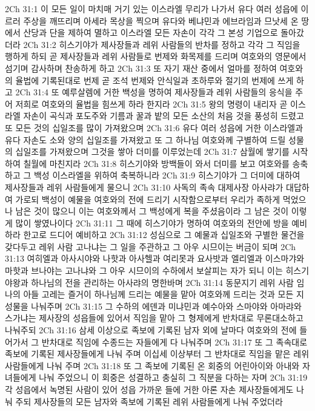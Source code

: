 2Ch 31:1  이 모든 일이 마치매 거기 있는 이스라엘 무리가 나가서 유다 여러 성읍에 이르러 주상을 깨뜨리며 아세라 목상을 찍으며 유다와 베냐민과 에브라임과 므낫세 온 땅에서 산당과 단을 제하여 멸하고 이스라엘 모든 자손이 각각 그 본성 기업으로 돌아갔더라
2Ch 31:2  히스기야가 제사장들과 레위 사람들의 반차를 정하고 각각 그 직임을 행하게 하되 곧 제사장들과 레위 사람들로 번제와 화목제를 드리며 여호와의 영문에서 섬기며 감사하며 찬송하게 하고
2Ch 31:3  또 자기 재산 중에서 얼마를 정하여 여호와의 율법에 기록된대로 번제 곧 조석 번제와 안식일과 초하루와 절기의 번제에 쓰게 하고
2Ch 31:4  또 예루살렘에 거한 백성을 명하여 제사장들과 레위 사람들의 응식을 주어 저희로 여호와의 율법을 힘쓰게 하라 한지라
2Ch 31:5  왕의 명령이 내리자 곧 이스라엘 자손이 곡식과 포도주와 기름과 꿀과 밭의 모든 소산의 처음 것을 풍성히 드렸고 또 모든 것의 십일조를 많이 가져왔으며
2Ch 31:6  유다 여러 성읍에 거한 이스라엘과 유다 자손도 소와 양의 십일조를 가져왔고 또 그 하나님 여호와께 구별하여 드릴 성물의 십일조를 가져왔으며 그것을 쌓아 더미를 이루었는데
2Ch 31:7  삼월에 쌓기를 시작하여 칠월에 마친지라
2Ch 31:8  히스기야와 방백들이 와서 더미를 보고 여호와를 송축하고 그 백성 이스라엘을 위하여 축복하니라
2Ch 31:9  히스기야가 그 더미에 대하여 제사장들과 레위 사람들에게 물으니
2Ch 31:10  사독의 족속 대제사장 아사랴가 대답하여 가로되 백성이 예물을 여호와의 전에 드리기 시작함으로부터 우리가 족하게 먹었으나 남은 것이 많으니 이는 여호와께서 그 백성에게 복을 주셨음이라 그 남은 것이 이렇게 많이 쌓였나이다
2Ch 31:11  그 때에 히스기야가 명하여 여호와의 전안에 방을 예비하라 한고로 드디어 예비하고
2Ch 31:12  성심으로 그 예물과 십일조와 구별한 물건을 갖다두고 레위 사람 고나냐는 그 일을 주관하고 그 아우 시므이는 버금이 되며
2Ch 31:13  여히엘과 아사시야와 나핫과 아사헬과 여리못과 요사밧과 엘리엘과 이스마갸와 마핫과 브나야는 고나냐와 그 아우 시므이의 수하에서 보살피는 자가 되니 이는 히스기야왕과 하나님의 전을 관리하는 아사랴의 명한바며
2Ch 31:14  동문지기 레위 사람 임나의 아들 고레는 즐거이 하나님께 드리는 예물을 맡아 여호와께 드리는 것과 모든 지성물을 나눠주며
2Ch 31:15  그 수하의 에덴과 미냐민과 예수아와 스마야와 아마랴와 스가냐는 제사장의 성읍들에 있어서 직임을 맡아 그 형제에게 반차대로 무론대소하고 나눠주되
2Ch 31:16  삼세 이상으로 족보에 기록된 남자 외에 날마다 여호와의 전에 들어가서 그 반차대로 직임에 수종드는 자들에게 다 나눠주며
2Ch 31:17  또 그 족속대로 족보에 기록된 제사장들에게 나눠 주며 이십세 이상부터 그 반차대로 직임을 맡은 레위 사람들에게 나눠 주며
2Ch 31:18  또 그 족보에 기록된 온 회중의 어린아이와 아내와 자녀들에게 나눠 주었으니 이 회중은 성결하고 충실히 그 직분을 다하는 자며
2Ch 31:19  각 성읍에서 녹명된 사람이 있어 성읍 가까운 들에 거한 아론 자손 제사장들에게도 나눠 주되 제사장들의 모든 남자와 족보에 기록된 레위 사람들에게 나눠 주었더라
